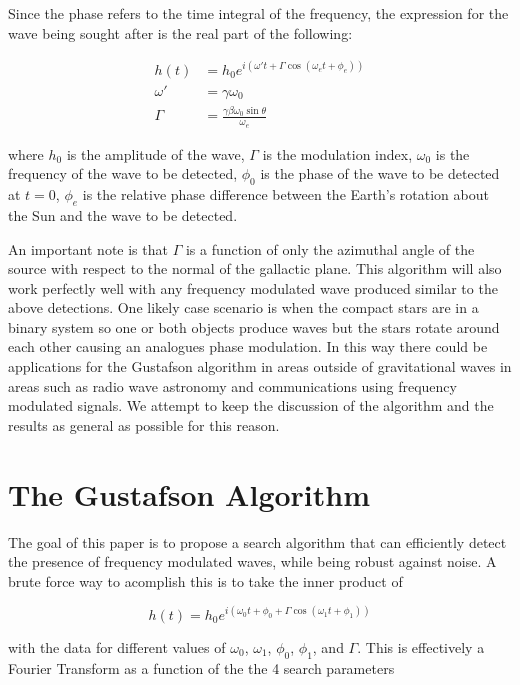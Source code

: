 \documentclass[onecolumn, groupedaddress, 10pt]{revtex4-1}
\begin{document}
Since the phase refers to the time integral of the frequency, the expression for the wave being sought after is the real part of the following: 

\begin{align}
h(t)    &= h_0 e^{i \left( \omega' t + \Gamma \cos (\omega_e t + \phi_e) \right)}		\\
\omega' &= \gamma \omega_0															\\
\Gamma  &= \frac{\gamma \beta \omega_0 \sin \theta}{\omega_e}
\end{align}


where $h_0$ is the amplitude of the wave, $\Gamma$ is the modulation index, $\omega_0$ is the frequency of the wave to be detected, $\phi_0$ is the phase of the wave to be detected at $t=0$, $\phi_e$ is the relative phase difference between the Earth's rotation about the Sun and the wave to be detected.

An important note is that $\Gamma$ is a function of only the azimuthal angle of the source with respect to the normal of the gallactic plane. This algorithm will also work perfectly well with any frequency modulated wave produced similar to the above detections. One likely case scenario is when the compact stars are in a binary system so one or both objects produce waves but the stars rotate around each other causing an analogues phase modulation.  In this way there could be applications for the Gustafson algorithm in areas outside of gravitational waves in areas such as radio wave astronomy and communications using frequency modulated signals. We attempt to keep the discussion of the algorithm and the results as general as possible for this reason.

\section{The Gustafson Algorithm}
The goal of this paper is to propose a search algorithm that can efficiently detect the presence of frequency modulated waves, while being robust against noise.  A brute force way to acomplish this is to take the inner product of 

\begin{equation}
h(t) = h_0 e^{i\left( \omega_0 t + \phi_0 + \Gamma \cos (\omega_1 t + \phi_1 ) \right)}
\end{equation}

with the data for different values of $\omega_0$, $\omega_1$, $\phi_0$, $\phi_1$, and $\Gamma$.  This is effectively a Fourier Transform as a function of the the 4 search parameters
\end{document}
